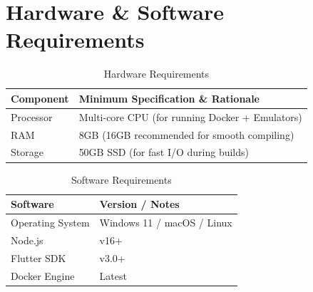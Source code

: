 \section{Hardware \& Software Requirements}
\begin{table}[H]
\centering
\caption{Hardware Requirements}
\vspace{0.2cm}
\begin{tabular}{|l|p{10cm}|}
\hline
\textbf{Component} & \textbf{Minimum Specification \& Rationale} \\ \hline
Processor & Multi-core CPU (for running Docker + Emulators) \\ \hline
RAM & 8GB (16GB recommended for smooth compiling) \\ \hline
Storage & 50GB SSD (for fast I/O during builds) \\ \hline
\end{tabular}
\end{table}

\begin{table}[H]
\centering
\caption{Software Requirements}
\vspace{0.2cm}
\begin{tabular}{|l|p{10cm}|}
\hline
\textbf{Software} & \textbf{Version / Notes} \\ \hline
Operating System & Windows 11 / macOS / Linux \\ \hline
Node.js & v16+ \\ \hline
Flutter SDK & v3.0+ \\ \hline
Docker Engine & Latest \\ \hline
\end{tabular}
\end{table}

